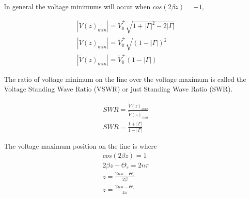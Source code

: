 \documentclass{ximera}
\begin{document}
\begin{itemize}
In general the voltage minimums will occur when
$cos(2 \beta z)=-1$,



\begin{eqnarray}
|\tilde{V}(z)_{min}|=\tilde{V}_0^+\sqrt{1+|\Gamma|^2-2 |\Gamma|} \nonumber  \\
|\tilde{V}(z)_{min}| =\tilde{V}_0^+\sqrt{(1-|\Gamma|)^2}  \nonumber \\
|\tilde{V}(z)_{min}| =\tilde{V}_0^+ (1-|\Gamma|) 
\end{eqnarray}

The ratio of voltage minimum on the line over the voltage maximum is
called the Voltage Standing Wave Ratio (VSWR) or just Standing Wave
Ratio (SWR).

\begin{eqnarray}
SWR=\frac{\tilde{V}(z)_{max}}{ \tilde{V}(z)_{min}} \nonumber \\
SWR=\frac{1+|\Gamma|}{1-|\Gamma|}
\end{eqnarray}

The voltage maximum position on the line is where
\begin{eqnarray}
cos(2 \beta z)=1 \nonumber \\
2 \beta z + \Theta_r = 2 n \pi \nonumber \\
z =\frac{ 2 n \pi -\Theta_r }{ 2 \beta} \nonumber \\
z=\frac{ 2 n \pi -\Theta_r }{ 4 \pi}
\end{eqnarray}



\end{itemize}
\end{document}
